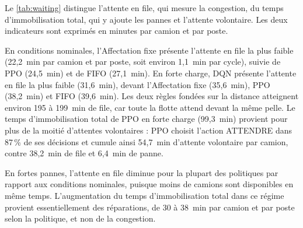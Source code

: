 \documentclass[11pt,a4paper]{article}
\newif\ifrevmarks
\newcommand{\revtag}[1]{\ifrevmarks\textsuperscript{\textcolor{red!70!black}{\scriptsize[#1]}}\fi}
\newenvironment{revbloc}[1]{\par\ifrevmarks\color{revcolor}\noindent\revtag{#1}\ \fi}{\par}
\begin{document}
\begin{revbloc}{M2, M17, m13, m14}
Le \cref{tab:waiting} distingue l'attente en file, qui mesure la congestion, du temps d'immobilisation total, qui y ajoute les pannes et l'attente volontaire. Les deux indicateurs sont exprimés en minutes par camion et par poste.

En conditions nominales, l'Affectation fixe présente l'attente en file la plus faible (22,2~min par camion et par poste, soit environ 1,1~min par cycle), suivie de PPO (24,5~min) et de FIFO (27,1~min). En forte charge, DQN présente l'attente en file la plus faible (31,6~min), devant l'Affectation fixe (35,6~min), PPO (38,2~min) et FIFO (39,6~min). Les deux règles fondées sur la distance atteignent environ 195 à 199~min de file, car toute la flotte attend devant la même pelle. Le temps d'immobilisation total de PPO en forte charge (99,3~min) provient pour plus de la moitié d'attentes volontaires : PPO choisit l'action ATTENDRE dans 87\,\% de ses décisions et cumule ainsi 54,7~min d'attente volontaire par camion, contre 38,2~min de file et 6,4~min de panne.

En fortes pannes, l'attente en file diminue pour la plupart des politiques par rapport aux conditions nominales, puisque moins de camions sont disponibles en même temps. L'augmentation du temps d'immobilisation total dans ce régime provient essentiellement des réparations, de 30 à 38~min par camion et par poste selon la politique, et non de la congestion.
\end{revbloc}
\end{document}
